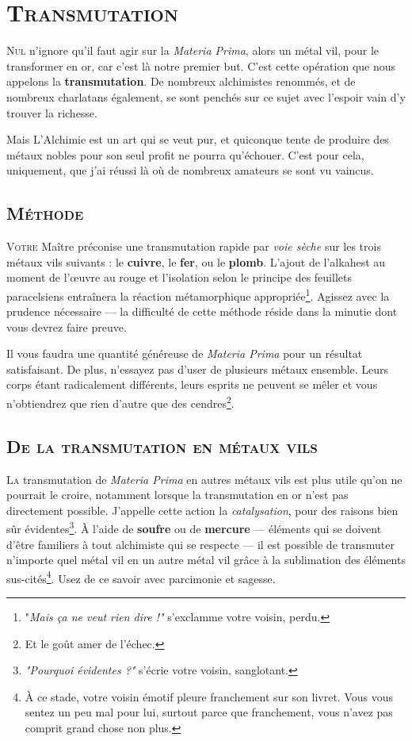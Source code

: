 \section{\textsc{Transmutation}}

\lettrine{N}{ul} n'ignore qu'il faut agir sur la \emph{Materia Prima}, alors un métal vil,
pour le transformer en or, car c'est là notre premier but. C'est cette
opération que nous appelons la \textbf{transmutation}. De nombreux
alchimistes renommés, et de nombreux charlatans également, se sont penchés sur
ce sujet avec l'espoir vain d'y trouver la richesse.

Mais L'Alchimie est un art qui se veut pur, et quiconque tente de produire
des métaux nobles pour son seul profit ne pourra qu'échouer. C'est pour cela,
uniquement, que j'ai réussi là où de nombreux amateurs se sont vu vaincus.

\subsection{\textsc{Méthode}}

\lettrine{V}{otre} Maître préconise une transmutation rapide par \emph{voie sèche} sur
les trois métaux vils suivants : le \textbf{cuivre}, le \textbf{fer}, ou le
\textbf{plomb}. L'ajout de l'alkahest au moment de l'œuvre au rouge et
l'isolation selon le principe des feuillets paracelsiens entraînera la réaction
métamorphique appropriée\footnote{"\textit{Mais ça ne veut rien dire !"}
s'exclamme votre voisin, perdu.}.
Agissez avec la prudence nécessaire — la difficulté de cette méthode réside dans la
minutie dont vous devrez faire preuve.

Il vous faudra une quantité généreuse de \emph{Materia Prima} pour un résultat
satisfaisant. De plus, n'essayez pas d'user de plusieurs métaux ensemble. Leurs
corps étant radicalement différents, leurs esprits ne peuvent se mêler et vous
n'obtiendrez que rien d'autre que des cendres\footnote{Et le goût amer de
l'échec.}.

\subsection{\textsc{De la transmutation en métaux vils}}

\lettrine{L}{a} transmutation de \emph{Materia Prima} en autres métaux vils est plus utile
qu'on ne pourrait le croire, notamment lorsque la transmutation en or n'est pas
directement possible. J'appelle cette action la \emph{catalysation}, pour des
raisons bien sûr évidentes\footnote{\textit{"Pourquoi évidentes ?"} s'écrie
votre voisin, sanglotant.}. À l'aide de \textbf{soufre} ou de \textbf{mercure} —
éléments qui se doivent d'être familiers à tout alchimiste qui se respecte — il
est possible de transmuter n'importe quel métal vil en un autre métal vil grâce
à la sublimation des éléments sus-cités\footnote{À ce stade, votre voisin
émotif pleure franchement sur son livret. Vous vous sentez un peu mal pour lui,
surtout parce que franchement, vous n'avez pas comprit grand chose non plus.}.
Usez de ce savoir avec parcimonie et sagesse.

